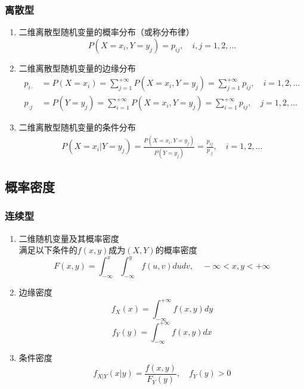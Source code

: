\subsubsection{离散型}
\begin{enumerate}
	\item 二维离散型随机变量的概率分布（或称分布律）
	\begin{equation}
		P(X=x_i, Y=y_j) = p_{ij}, \quad i,j = 1, 2, \dots
	\end{equation}

	\item 二维离散型随机变量的边缘分布
	\begin{align}
		p_{i\cdot} &= P(X=x_i) 
		= \sum_{j=1}^{+\infty}P(X=x_i, Y=y_j) 
		= \sum_{j=1}^{+\infty}p_{ij}, \quad i = 1, 2, \dots \\
		p_{\cdot j} &= P(Y=y_j) 
		= \sum_{i=1}^{+\infty}P(X=x_i, Y=y_j) 
		= \sum_{i=1}^{+\infty}p_{ij}, \quad j = 1, 2, \dots 
	\end{align}
	\item 二维离散型随机变量的条件分布
	\begin{equation}\begin{aligned}
		P(X=x_i|Y=y_j) = \frac{P(X=x_i, Y=y_j)}{P(Y=y_j)} = \frac{p_{ij}}{p_{\cdot j}}, \quad i = 1, 2, \dots
	\end{aligned}\end{equation}


\end{enumerate}

\subsection{概率密度}
\subsubsection{连续型}
\begin{enumerate}
	\item 二维随机变量及其概率密度 \\
	满足以下条件的$f(x, y)$成为$(X, Y)$的概率密度 \\
	\begin{equation}
		F(x, y) = \int_{-\infty}^{x} \int_{-\infty}^{y}f(u, v)dudv, \quad -\infty <x, y < +\infty
	\end{equation}
	\item 边缘密度
	\begin{equation}
		f_X(x) = \int_{-\infty}^{+\infty}f(x, y)dy
	\end{equation}
	\begin{equation}
		f_Y(y) = \int_{-\infty}^{+\infty}f(x, y)dx
	\end{equation}
	\item 条件密度
	\begin{equation}
		f_{X|Y}(x|y) = \frac{f(x,y)}{F_Y(y)}, \quad f_Y(y) > 0
	\end{equation}
\end{enumerate}

